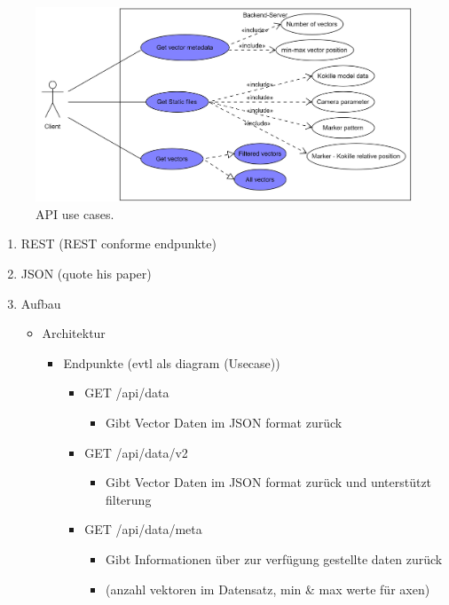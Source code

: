 \begin{figure}
	\centering
	\includegraphics[width=.80\linewidth]{images/backend/APIUseCases}
	\caption{API use cases.}
	\label{fig:backendUseCase}
\end{figure}


\begin{enumerate}
	\item REST (REST conforme endpunkte)
	\item JSON (quote his paper)
	\item Aufbau
	\begin{itemize}
		\item Architektur
		\begin{itemize}
			\item Endpunkte (evtl als diagram (Usecase))
			\begin{itemize}
				\item GET /api/data
				\begin{itemize}
					\item Gibt Vector Daten im JSON format zurück
				\end{itemize}
				
				\item GET /api/data/v2
				\begin{itemize}
					\item Gibt Vector Daten im JSON format zurück und unterstützt filterung
				\end{itemize}
				
				\item GET /api/data/meta
				\begin{itemize}
					\item Gibt Informationen über zur verfügung gestellte daten zurück
					\item (anzahl vektoren im Datensatz, min \& max werte für axen)
				\end{itemize}
			\end{itemize}
			

\end{itemize}
\end{itemize}
\end{enumerate}
